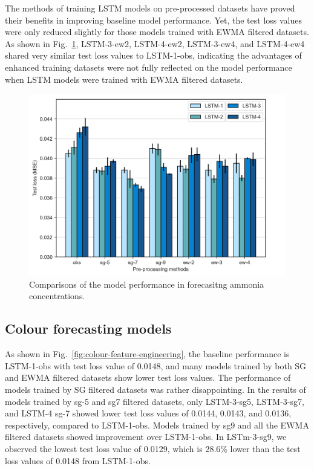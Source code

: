The methods of training LSTM models on pre-processed datasets have proved their benefits in improving baseline model performance. Yet, the test loss values were only reduced slightly for those models trained with EWMA filtered datasets. As shown in Fig.~\ref{fig:nh3-feature-engineering}, LSTM-3-ew2, LSTM-4-ew2, LSTM-3-ew4, and LSTM-4-ew4 shared very similar test loss values to LSTM-1-obs, indicating the advantages of enhanced training datasets were not fully reflected on the model performance when LSTM models were trained with EWMA filtered datasets.

\begin{figure}[!ht]
    \centering
    \includegraphics[width=1.0\columnwidth]{imgs/results/feature-engineering/nh3-input-1-4-comparison.png}
    \caption{Comparisons of the model performance in forecasitng ammonia concentrations.}
    \label{fig:nh3-feature-engineering}
 \end{figure}

\subsection{Colour forecasting models}

As shown in Fig.~\ref{fig:colour-feature-engineering}, the baseline performance is LSTM-1-obs with test loss value of 0.0148, and many models trained by both SG and EWMA filtered datasets show lower test loss values. The performance of models trained by SG filtered datasets was rather disappointing. In the results of models trained by sg-5 and sg7 filtered datasets, only LSTM-3-sg5, LSTM-3-sg7, and LSTM-4 sg-7 showed lower test loss values of 0.0144, 0.0143, and 0.0136, respectively, compared to LSTM-1-obs. Models trained by sg9 and all the EWMA filtered datasets showed improvement over LSTM-1-obs. In LSTm-3-sg9, we observed the lowest test loss value of 0.0129, which is 28.6\% lower than the test loss values of 0.0148 from LSTM-1-obs. 

